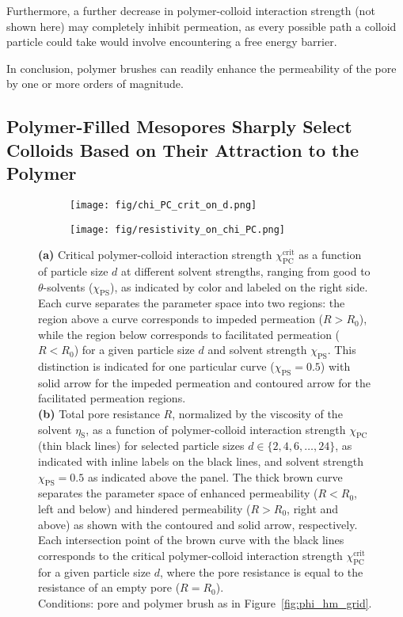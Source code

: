 \documentclass[12pt, a4paper]{article}
\begin{document}
Furthermore, a further decrease in polymer-colloid interaction strength (not shown here) may completely inhibit permeation, as every possible path a colloid particle could take would involve encountering a free energy barrier.

In conclusion, polymer brushes can readily enhance the permeability of the pore by one or more orders of magnitude.

\subsection{Polymer-Filled Mesopores Sharply Select Colloids Based on Their Attraction to the Polymer}

\begin{figure}
    \centering
    \begin{subfigure}[b]{0.52\textwidth}
        \texttt{[image: fig/chi\_PC\_crit\_on\_d.png]}
        \caption{}
    \end{subfigure}%
    \hspace{0.03\textwidth}
    \begin{subfigure}[b]{0.4\textwidth}
        \texttt{[image: fig/resistivity\_on\_chi\_PC.png]}
        \caption{}
    \end{subfigure}
    \caption{
        \textbf{(a)} Critical polymer-colloid interaction strength $\chi_{\text{PC}}^{\text{crit}}$ as a function of particle size $d$ at different solvent strengths, ranging from good to $\theta$-solvents ($\chi_{\text{PS}}$), as indicated by color and labeled on the right side.
        Each curve separates the parameter space into two regions: the region above a curve corresponds to impeded permeation ($R > R_{0}$), while the region below corresponds to facilitated permeation ($R < R_{0}$) for a given particle size $d$ and solvent strength $\chi_{\text{PS}}$.
        This distinction is indicated for one particular curve ($\chi_{\text{PS}}=0.5$) with solid arrow for the impeded permeation and contoured arrow for the facilitated permeation regions.
        \\
        \textbf{(b)} Total pore resistance $R$, normalized by the viscosity of the solvent $\eta_\text{S}$, as a function of polymer-colloid interaction strength $\chi_{\text{PC}}$ (thin black lines) for selected particle sizes $d \in \{2, 4, 6, \dots, 24\}$, as indicated with inline labels on the black lines, and solvent strength $\chi_{\text{PS}}=0.5$ as indicated above the panel.
        The thick brown curve separates the parameter space of enhanced permeability ($R < R_{0}$, left and below) and hindered permeability ($R > R_{0}$, right and above) as shown with the contoured and solid arrow, respectively.
        Each intersection point of the brown curve with the black lines corresponds to the critical polymer-colloid interaction strength $\chi_{\text{PC}}^{\text{crit}}$ for a given particle size $d$, where the pore resistance is equal to the resistance of an empty pore ($R = R_{0}$).
        \\
        Conditions: pore and polymer brush as in Figure~\ref{fig:phi_hm_grid}.
    }
    \label{fig:R_vs_chi_PC}
\end{figure}
\end{document}
